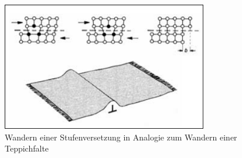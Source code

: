 \documentclass[12pt,a4paper,parskip]{scrartcl}
\begin{document}
{\begin{figure}
\centering
\includegraphics[width=0.8\textwidth]{wandernstufenversetzung}
\caption[Wandern einer Stufenversetzung]{Wandern einer Stufenversetzung in Analogie zum Wandern einer Teppichfalte\protect\footnotemark}
\label{fig:wandernstufenversetzung}
\end{figure}

}
\end{document}
